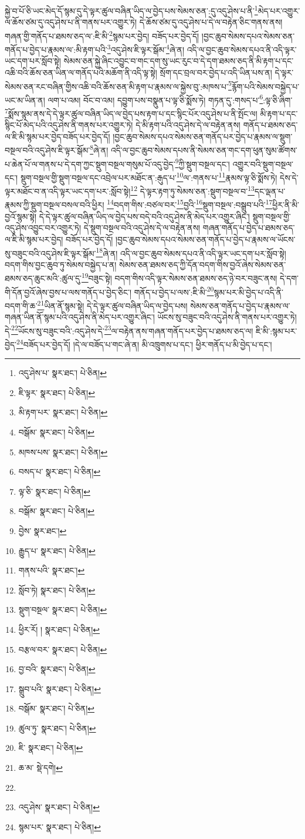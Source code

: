 སྐྱེ་བ་པོ་ཅི་ཡང་མེད་དོ་སྙམ་དུ་དེ་ལྟར་ཚུལ་བཞིན་ཡིད་ལ་བྱེད་པས་སེམས་ཅན་:དུ་འདུ་ཤེས་པ་ནི་\footnote{འདུ་ཤེས་པ་  སྣར་ཐང་།  པེ་ཅིན། }མེད་པར་འགྱུར་ལ་ཆོས་ཙམ་དུ་འདུ་ཤེས་པ་ནི་གནས་པར་འགྱུར་ཏེ། དེ་ཆོས་ཙམ་དུ་འདུ་ཤེས་པ་དེ་ལ་བརྟེན་ཅིང་གནས་ནས། གཞན་གྱི་གནོད་པ་ཐམས་ཅད་ལ་:ཇི་མི་\footnote{ཇི་ལྟར་  སྣར་ཐང་།  པེ་ཅིན། }སྙམ་པར་བྱེད། བཟོད་པར་བྱེད་དོ། །བྱང་ཆུབ་སེམས་དཔའ་སེམས་ཅན་གནོད་པ་བྱེད་པ་རྣམས་ལ་:མི་རྟག་པའི་\footnote{མི་རྟག་པར་  སྣར་ཐང་།  པེ་ཅིན། }འདུ་ཤེས་ཇི་ལྟར་སྒོམ་\footnote{བསྒོམ་  སྣར་ཐང་།  པེ་ཅིན། }ཞེ་ན། འདི་ལ་བྱང་ཆུབ་སེམས་དཔའ་ནི་འདི་ལྟར་ཡང་དག་པར་སློབ་སྟེ། སེམས་ཅན་སྐྱེ་ཞིང་འབྱུང་བ་གང་དག་སུ་ཡང་རུང་བ་དེ་དག་ཐམས་ཅད་ནི་མི་རྟག་པ་དང་འཆི་བའི་ཆོས་ཅན་ཡིན་ལ་གནོད་པའི་མཆོག་ནི་འདི་ལྟ་སྟེ། སྲོག་དང་བྲལ་བར་བྱེད་པ་འདི་ཡིན་པས་ན། དེ་ལྟར་སེམས་ཅན་རང་བཞིན་གྱིས་འཆི་བའི་ཆོས་ཅན་མི་རྟག་པ་རྣམས་ལ་སྐྱེས་བུ་:མཁས་པ་\footnote{མཁས་པས་  སྣར་ཐང་།  པེ་ཅིན། }རྙོག་པའི་སེམས་བསྐྱེད་པ་ཡང་མ་ཡིན་ན། ལག་པ་འམ། བོང་བ་འམ། དབྱུག་པས་བསྣུན་པ་ལྟ་ཅི་སྨོས་ཏེ། གཏན་དུ་:གསད་པ་\footnote{བསད་པ་  སྣར་ཐང་།  པེ་ཅིན། }:ལྟ་ཅི་ཞིག་\footnote{ལྟ་ཅི་  སྣར་ཐང་།  པེ་ཅིན། }སྨོས་སྙམ་ནས་དེ་དེ་ལྟར་ཚུལ་བཞིན་ཡིད་ལ་བྱེད་པས་རྟག་པ་དང་སྙིང་པོར་འདུ་ཤེས་པ་ནི་སྤོང་ལ། མི་རྟག་པ་དང་སྙིང་པོ་མེད་པའི་འདུ་ཤེས་ནི་གནས་པར་འགྱུར་ཏེ། དེ་མི་རྟག་པའི་འདུ་ཤེས་དེ་ལ་བརྟེན་ནས། གནོད་པ་ཐམས་ཅད་ལ་ཇི་མི་སྙམ་པར་བྱེད་བཟོད་པར་བྱེད་དོ། །བྱང་ཆུབ་སེམས་དཔའ་སེམས་ཅན་གནོད་པར་བྱེད་པ་རྣམས་ལ་སྡུག་བསྔལ་བའི་འདུ་ཤེས་ཇི་ལྟར་སྒོམ་\footnote{བསྒོམ་  སྣར་ཐང་།  པེ་ཅིན། }ཞེ་ན། འདི་ལ་བྱང་ཆུབ་སེམས་དཔས་ནི་སེམས་ཅན་གང་དག་ཕུན་སུམ་ཚོགས་པ་ཆེན་པོ་ལ་གནས་པ་དེ་དག་ཀྱང་སྡུག་བསྔལ་གསུམ་པོ་འདུ་བྱེད་\footnote{བྱེས་  སྣར་ཐང་། }ཀྱི་སྡུག་བསྔལ་དང་། འགྱུར་བའི་སྡུག་བསྔལ་དང་། སྡུག་བསྔལ་གྱི་སྡུག་བསྔལ་དང་འབྲེལ་པར་མཐོང་ན་:རྒུད་པ་\footnote{རྒྱུད་པ་  སྣར་ཐང་།  པེ་ཅིན། }ལ་:གནས་པ་\footnote{གནས་པའི་  སྣར་ཐང་། }རྣམས་ལྟ་ཅི་སྨོས་ཏེ། དེས་དེ་ལྟར་མཐོང་བ་ན་འདི་ལྟར་ཡང་དག་པར་:སློབ་སྟེ།\footnote{སློབ་ཏེ།  སྣར་ཐང་།  པེ་ཅིན། } དེ་ལྟར་རྟག་ཏུ་སེམས་ཅན་:སྡུག་བསྔལ་བ་\footnote{སྡུག་བསྔལ་  སྣར་ཐང་།  པེ་ཅིན། }དང་ལྡན་པ་རྣམས་ཀྱི་སྡུག་བསྔལ་བསལ་བའི་ཕྱིར། \footnote{ཕྱིར་རོ། །   སྣར་ཐང་།  པེ་ཅིན། }བདག་གིས་:བཙལ་བར་\footnote{བརྩལ་བར་  སྣར་ཐང་།  པེ་ཅིན། }བྱའི་\footnote{བྱ་བའི་  སྣར་ཐང་།  པེ་ཅིན། }སྡུག་བསྔལ་:བསྒྲུབ་པའི་\footnote{སྒྲུབ་པའི་  སྣར་ཐང་།  པེ་ཅིན། }ཕྱིར་ནི་མི་བྱའོ་སྙམ་སྟེ། དེ་དེ་ལྟར་ཚུལ་བཞིན་ཡིད་ལ་བྱེད་པས་བདེ་བའི་འདུ་ཤེས་ནི་མེད་པར་འགྱུར་ཞིང་། སྡུག་བསྔལ་གྱི་འདུ་ཤེས་འབྱུང་བར་འགྱུར་ཏེ། དེ་སྡུག་བསྔལ་བའི་འདུ་ཤེས་དེ་ལ་བརྟེན་ནས། གཞན་གནོད་པ་བྱེད་པ་ཐམས་ཅད་ལ་ཇི་མི་སྙམ་པར་བྱེད། བཟོད་པར་བྱེད་དོ། །བྱང་ཆུབ་སེམས་དཔའ་སེམས་ཅན་གནོད་པ་བྱེད་པ་རྣམས་ལ་ཡོངས་སུ་བཟུང་བའི་འདུ་ཤེས་ཇི་ལྟར་སྒོམ་\footnote{བསྒོམ་  སྣར་ཐང་།  པེ་ཅིན། }ཞེ་ན། འདི་ལ་བྱང་ཆུབ་སེམས་དཔའ་ནི་འདི་ལྟར་ཡང་དག་པར་སློབ་སྟེ། བདག་གིས་བྱང་ཆུབ་ཏུ་སེམས་བསྐྱེད་པ་ན། སེམས་ཅན་ཐམས་ཅད་ཀྱི་དོན་བདག་གིས་བྱའོ་ཞེས་སེམས་ཅན་ཐམས་ཅད་ཆུང་མའི་:ཚུལ་དུ་\footnote{ཚུལ་ཏུ་  སྣར་ཐང་།  པེ་ཅིན། }བཟུང་སྟེ། བདག་གིས་འདི་ལྟར་སེམས་ཅན་ཐམས་ཅད་ཉེ་བར་བཟུང་ནས། དེ་དག་གི་དོན་བྱའོ་ཞེས་བྱས་པ་ལས་གནོད་པ་བྱེད་ཅིང་། གནོད་པ་བྱེད་པ་ལས་:ཇི་མི་\footnote{ཇི་  སྣར་ཐང་།  པེ་ཅིན། }སྙམ་པར་མི་བྱེད་པ་འདི་ནི་བདག་གི་ཆ་\footnote{ཆ་མ་  སྡེ་དགེ། }ཡིན་ནོ་སྙམ་སྟེ། དེ་དེ་ལྟར་ཚུལ་བཞིན་ཡིད་ལ་བྱེད་པས། སེམས་ཅན་གནོད་པ་བྱེད་པ་རྣམས་ལ་གཞན་ཡིན་ནོ་སྙམ་པའི་འདུ་ཤེས་ནི་མེད་པར་འགྱུར་ཞིང་། ཡོངས་སུ་བཟུང་བའི་འདུ་ཤེས་ནི་གནས་པར་འགྱུར་ཏེ། དེ་\footnote{}ཡོངས་སུ་བཟུང་བའི་:འདུ་ཤེས་དེ་\footnote{འདུ་ཤེས་  སྣར་ཐང་།  པེ་ཅིན། }ལ་བརྟེན་ནས་གཞན་གནོད་པར་བྱེད་པ་ཐམས་ཅད་ལ། ཇི་མི་:སྙམ་པར་བྱེད་\footnote{སྙམ་པར་  སྣར་ཐང་།  པེ་ཅིན། }བཟོད་པར་བྱེད་དོ། །དེ་ལ་བཟོད་པ་གང་ཞེ་ན། མི་འཁྲུགས་པ་དང་། ཕྱིར་གནོད་པ་མི་བྱེད་པ་དང་། 